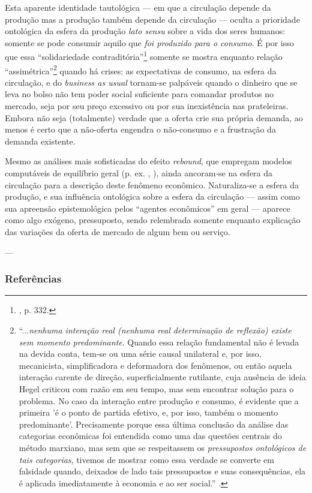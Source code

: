 Esta aparente identidade tautológica — em que a circulação depende da produção mas a produção também depende da circulação — oculta a prioridade ontológica da esfera da produção \textit{lato sensu} sobre a vida dos seres humanos: somente se pode consumir aquilo que \textit{foi produzido para o consumo}. É por isso que essa ``solidariedade contraditória''\footnote{\textcite{Lukacs2012}, p. 332. } somente se mostra enquanto relação ``assimétrica''\footnote{``...\textit{nenhuma interação real (nenhuma real determinação de reflexão) existe sem momento predominante}. Quando essa relação fundamental não é levada na devida conta, tem-se ou uma série causal unilateral e, por isso, mecanicista, simplificadora e deformadora dos fenômenos, ou então aquela interação carente de direção, superficialmente rutilante, cuja ausência de ideia Hegel criticou com razão em seu tempo, mas sem encontrar solução para o problema. No caso da interação entre produção e consumo, é evidente que a primeira 'é o ponto de partida efetivo, e, por isso, também o momento predominante'. Precisamente porque essa última conclusão da análise das categorias econômicas foi entendida como uma das questões centrais do método marxiano, mas sem que se respeitassem os \textit{pressupostos ontológicos de tais categorias}, tivemos de mostrar como essa verdade se converte em falsidade quando, deixados de lado tais pressupostos e suas consequências, ela é aplicada imediatamente à economia e ao ser social.'' \parencite[p. 334, grifo meu]{Lukacs2012}. } quando há crises: as expectativas de consumo, na esfera da circulação, e do \textit{business as usual} tornam-se palpáveis quando o dinheiro que se leva no bolso não tem poder social suficiente para comandar produtos no mercado, seja por seu preço excessivo ou por sua inexistência nas prateleiras. Embora não seja (totalmente) verdade que a oferta crie sua própria demanda, ao menos é certo que a não-oferta engendra o não-consumo e a frustração da demanda existente. 

Mesmo as análises mais sofisticadas do efeito \textit{rebound}, que empregam modelos computáveis de equilíbrio geral (p. ex. \textcite{Hanley2009}, \textcite{Wei2010}), ainda ancoram-se na esfera da circulação para a descrição deste fenômeno econômico. Naturaliza-se a esfera da produção, e sua influência ontológica sobre a esfera da circulação — assim como sua apreensão epistemológica pelos ``agentes econômicos'' em geral — aparece como algo exógeno, pressuposto, sendo relembrada somente enquanto explicação das variações da oferta de mercado de algum bem ou serviço.

---
\subsubsection{Referências}
